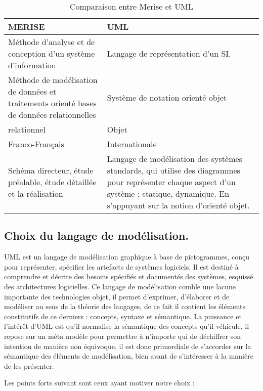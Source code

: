 \begin{table}[H]
	\caption{Comparaison entre Merise et UML}
	\label{Comparaison entre Merise et UML}
	\centering
	\begin{tabularx}{\linewidth}{|X|X|}
		\hline \rowcolor{lightgray}  
		\textbf  \textbf{MERISE} & \textbf{UML}\\
		\hline
		 Méthode d'analyse et de conception d'un système d'information &  Langage de représentation d'un SI.\\
		\hline
		Méthode de modélisation de données et traitements orienté bases de données relationnelles &  Système de notation orienté objet\\
		\hline
		 relationnel  & Objet \\
		\hline
		 Franco-Français &  Internationale \\	
		\hline
		 Schéma directeur, étude préalable, étude détaillée et la réalisation &  Langage de modélisation des systèmes standards, qui utilise des diagrammes pour représenter chaque aspect d'un système : statique, dynamique. En s'appuyant sur la notion d'orienté objet. \\	
		\hline		
	\end{tabularx}
\end{table}

\subsection{Choix du langage de modélisation.\cite{Ref02}}

UML est un langage de modélisation graphique à base de pictogrammes, conçu pour représenter, spécifier les artefacts de systèmes logiciels. Il est destiné à comprendre et décrire des besoins spécifiés et documentés des systèmes, esquissé des architectures logicielles. Ce langage de modélisation comble une lacune importante des technologies objet, il permet d’exprimer, d’élaborer et de modéliser au sens de la théorie des langages, de ce fait il contient les éléments constitutifs de ce derniers : concepts, syntaxe et sémantique. La puissance et l’intérêt d’UML est qu’il normalise la sémantique des concepts qu’il véhicule, il repose sur un méta modèle pour permettre à n’importe qui de déchiffrer son intention de manière non équivoque, il est donc primordiale de s’accorder sur la sémantique des éléments de modélisation, bien avant de s'intéresser à la manière de les présenter.

Les points forts suivant sont ceux ayant motiver notre choix :

